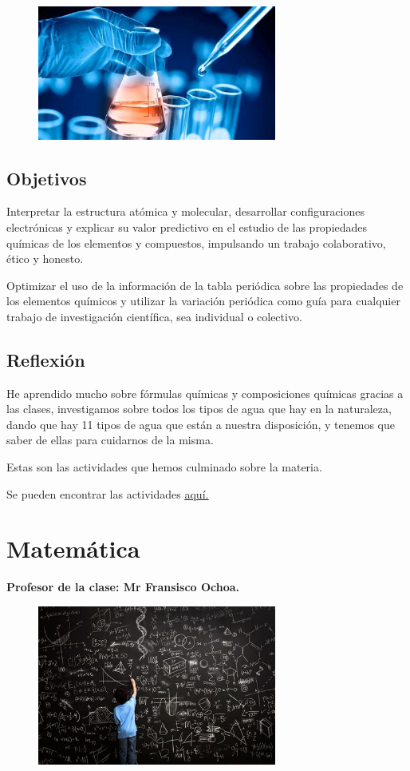 \documentclass[a4paper, 12pt]{article}
\begin{document}
\begin{figure}[h]
  \includegraphics[width=0.7\textwidth, center]{quimica.jpeg}
\end{figure}

\subsection{Objetivos}
Interpretar la estructura atómica y molecular, desarrollar configuraciones electrónicas y explicar su valor predictivo en el estudio de las propiedades químicas de los elementos y compuestos, impulsando un trabajo colaborativo, ético y honesto.

Optimizar el uso de la información de la tabla periódica sobre las propiedades de los elementos químicos y utilizar la variación periódica como guía para cualquier trabajo de investigación científica, sea individual o colectivo.

\subsection{Reflexión}
He aprendido mucho sobre fórmulas químicas y composiciones químicas gracias a las clases, investigamos sobre todos los tipos de agua que hay en la naturaleza, dando que hay 11 tipos de agua que están a nuestra disposición, y tenemos que saber de ellas para cuidarnos de la misma.

Estas son las actividades que hemos culminado sobre la materia.

Se pueden encontrar las actividades \href{https://drive.google.com/drive/folders/1sVpbMzXSFN_uNBDNxBb1wdva3F2rRT37?usp=sharing}{\underline{aquí.}}

\section{Matemática}
\textbf{Profesor de la clase: Mr Fransisco Ochoa.}
\begin{figure}[h!]
  \includegraphics[width=0.7\textwidth, center]{math.jpeg}
\end{figure}
\end{document}
